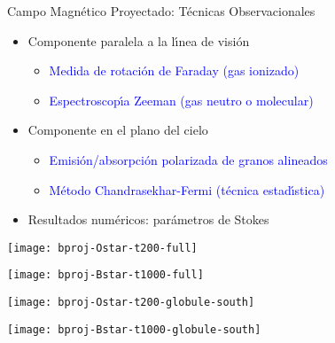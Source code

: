 \documentclass
[
]
{beamer}
\newcommand\blue{\textcolor{blue}}
\begin{document}
{
\begin{frame}[plain]
\centerline{Campo Magn\'etico Proyectado: T\'ecnicas Observacionales}
\vfill
\begin{itemize}
\item<1-> Componente paralela a la l\'{\i}nea de visi\'on
\begin{itemize}
\item<2-> \blue{Medida de rotaci\'on de Faraday (gas ionizado)}
\item<2-> \blue{Espectroscop\'{\i}a Zeeman (gas neutro o molecular)}
\end{itemize}
\item<1-> Componente en el plano del cielo
\begin{itemize}
\item<3-> \blue{Emisi\'on/absorpci\'on polarizada de granos alineados}
\item<3-> \blue{M\'etodo Chandrasekhar-Fermi (t\'ecnica estad\'{\i}stica)}
\end{itemize}
\item<4-> Resultados num\'ericos: par\'ametros de Stokes
\end{itemize}
\end{frame}
}
{
\begin{frame}[plain]
\centerline{\color{white}{Campo Magn\'etico Proyectado: Estrella O}}
\vfill
\centerline{\texttt{[image: bproj-Ostar-t200-full]}}
\vfill
\centerline{}
\end{frame}
\begin{frame}[plain]
\centerline{\color{white}{Campo Magn\'etico Proyectado: Estrella B}}
\vfill
  \centerline{\texttt{[image: bproj-Bstar-t1000-full]}}
\vfill
\centerline{}
\end{frame}
\begin{frame}[plain]
\centerline{\color{white}{Enfoque en gl\'obulo denso: Estrella O}}
\vfill
  \centerline{\texttt{[image: bproj-Ostar-t200-globule-south]}}
\vfill
\end{frame}
\begin{frame}[plain]
\centerline{\color{white}{Enfoque en gl\'obulo denso: Estrella B}}
\vfill
\centerline{\texttt{[image: bproj-Bstar-t1000-globule-south]}}
\vfill
\end{frame}
}
\end{document}
